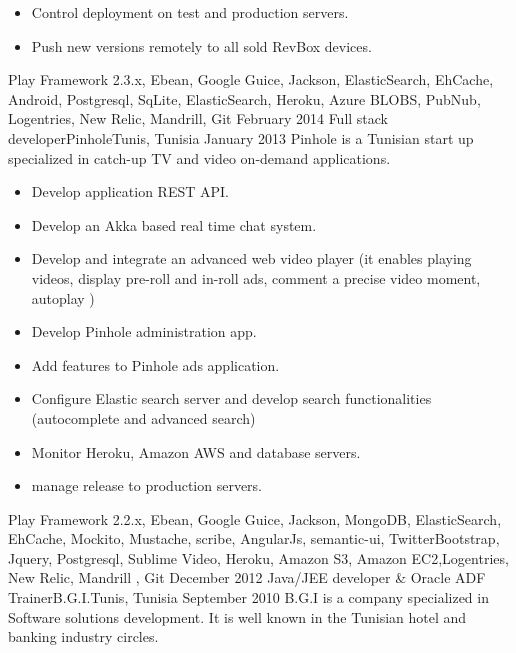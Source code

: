\begin{experiences}
{\begin{itemize}
                        \item Control deployment on test and production servers.
                        \item Push new versions remotely to all sold RevBox devices.
                      \end{itemize}
                    }
                    { Play Framework 2.3.x, Ebean, Google Guice, Jackson, ElasticSearch, EhCache, Android, Postgresql, SqLite, ElasticSearch, Heroku, Azure BLOBS, PubNub, Logentries, New Relic, Mandrill, Git}
  \emptySeparator
  \experience
    {February 2014}   {Full stack developer}{Pinhole}{Tunis, Tunisia}
    {January 2013} {Pinhole is a Tunisian start up specialized in catch-up TV and video on-demand applications.}
                    {
                      \begin{itemize}
                        \item Develop application REST API.
                        \item Develop an Akka based real time chat system.
                        \item Develop and integrate an advanced web video player (it enables playing videos, display pre-roll and in-roll ads, comment a precise video moment, autoplay )
                        \item Develop Pinhole administration app.
                        \item Add features to Pinhole ads application.
                        \item Configure Elastic search server and develop search functionalities (autocomplete and advanced search)
                        \item Monitor Heroku, Amazon AWS and database servers.
                        \item manage release to production servers.
                      \end{itemize}
                    }
                    {Play Framework 2.2.x, Ebean, Google Guice, Jackson, MongoDB, ElasticSearch, EhCache, Mockito, Mustache, scribe, AngularJs, semantic-ui, TwitterBootstrap, Jquery, Postgresql, Sublime Video, Heroku, Amazon S3, Amazon EC2,Logentries, New Relic, Mandrill , Git}
  \emptySeparator
  \experience
    {December 2012}   {Java/JEE developer \& Oracle ADF Trainer}{B.G.I.}{Tunis, Tunisia}
    {September 2010} {B.G.I is a company specialized in Software solutions development. It is well known in the Tunisian hotel and banking industry circles.}
                    {
}
\end{experiences}

